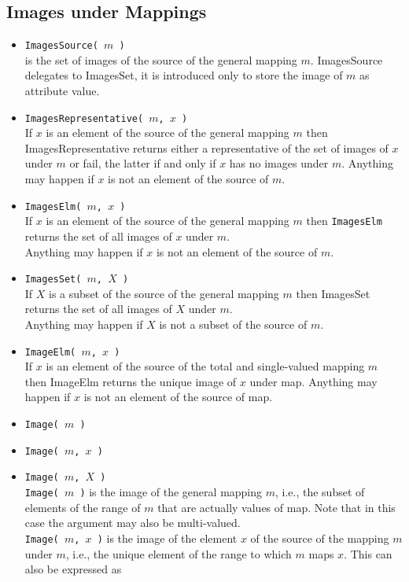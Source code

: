 \documentclass[11pt]{amsart}
\theoremstyle{plain}
\newcommand{\<}{\ensuremath{\langle}}
\renewcommand{\>}{\ensuremath{\rangle}}
\begin{document}
\subsection{Images under Mappings}
\begin{itemize}
\item {\tt ImagesSource( $m$ )}\\
is the set of images of the source of the general mapping $m$.
ImagesSource delegates to ImagesSet, it is introduced only to store the image of $m$ as attribute value.
\item {\tt ImagesRepresentative( $m$, $x$ )}\\
If $x$ is an element of the source of the general mapping $m$ then ImagesRepresentative returns either
a representative of the set of images of $x$ under $m$ or fail, the latter if and only if $x$ has no images
under $m$.
Anything may happen if $x$ is not an element of the source of $m$.
\item {\tt ImagesElm( $m$, $x$ )}\\
If $x$ is an element of the source of the general mapping $m$ then {\tt ImagesElm} returns the set of all images
of $x$ under $m$.
\\[4pt]
Anything may happen if $x$ is not an element of the source of $m$.
\item {\tt ImagesSet( $m$, $X$ )}\\
If $X$ is a subset of the source of the general mapping $m$ then ImagesSet returns the set of all images
of $X$ under $m$.
\\[4pt]
Anything may happen if $X$ is not a subset of the source of $m$.
\item {\tt ImageElm( $m$, $x$ )}\\
If $x$ is an element of the source of the total and single-valued mapping $m$ then ImageElm returns the
unique image of $x$ under map.
Anything may happen if $x$ is not an element of the source of map.
\item {\tt Image( $m$ )}
\item {\tt Image( $m$, $x$ )}
\item {\tt Image( $m$, $X$ )}\\
{\tt Image( $m$ )} is the image of the general mapping $m$, i.e., the subset of
elements of the range of $m$ that are actually values of map. 
Note that in this case the argument may also be multi-valued.
\\[4pt]
{\tt Image( $m$, $x$ )} is the image of the element $x$ of the source of the mapping $m$ under $m$, i.e., the
unique element of the range to which $m$ maps $x$. This can also be expressed as \\

\end{itemize}
\end{document}
